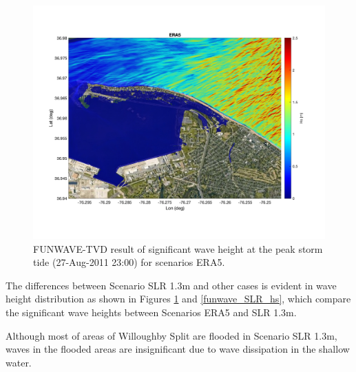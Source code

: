 \documentclass[11pt]{article}
\newcommand{\be}{\begin{equation}}
\newcommand{\ee}{\end{equation}}
\begin{document}
\begin{figure}[h!]
\centering
\includegraphics[width=\textwidth]{./figures/funwave_ERA5_hs.jpg}
\caption{FUNWAVE-TVD result of significant wave height at the peak storm tide (27-Aug-2011 23:00) for scenarios ERA5.  }
\label{funwave_ERA5_hs}
\centering
\end{figure}

The differences between Scenario SLR 1.3m and other cases is evident in wave height distribution as shown in Figures \ref{funwave_ERA5_hs} and \ref{funwave_SLR_hs}, which compare the significant wave heights between Scenarios ERA5 and SLR 1.3m. 


Although most of areas of Willoughby Split are flooded in Scenario SLR 1.3m, waves in the flooded areas are insignificant due to wave dissipation in the shallow water. 
\end{document}

